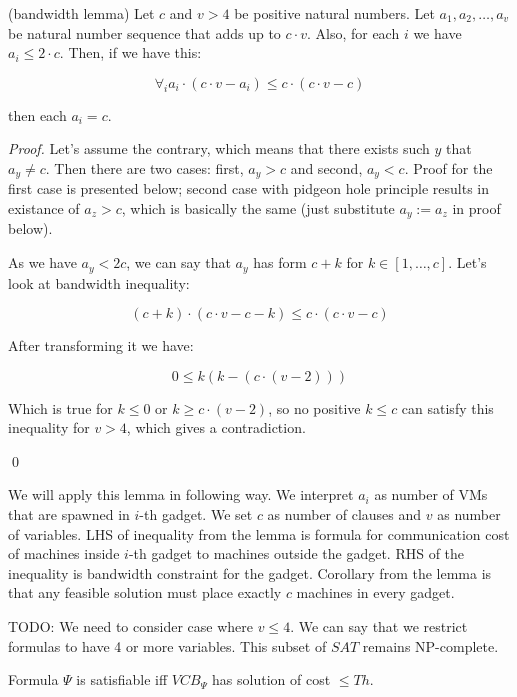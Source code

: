 \begin{lemma} (bandwidth lemma)
  Let $c$ and $v > 4$ be positive natural numbers. Let $a_1, a_2, \ldots,
  a_v$ be natural number sequence that adds up to $c \cdot v$. Also, for
  each $i$ we have $a_i \leq 2 \cdot c$. Then, if we have this:

  $$ \forall_i a_i \cdot (c \cdot v - a_i) \leq c \cdot (c \cdot v -
  c) $$

  then each $a_i = c$.
\end{lemma}
\begin{proof}

Let's assume the contrary, which means that there exists such $y$ that
$a_y \neq c$. Then there are two cases: first, $a_y>c$ and second,
$a_y<c$. Proof for the first case is presented below; second case
with pidgeon hole principle results in existance of $a_z > c$, which
is basically the same (just substitute $a_y := a_z$ in proof below).

As we have $a_y < 2c$, we can say that $a_y$ has form $c +
k$ for $k \in [1, \ldots, c]$. Let's look at bandwidth inequality:

$$ (c + k) \cdot (c \cdot v - c - k) \leq c \cdot (c \cdot v - c) $$

After transforming it we have:

$$ 0 \leq k(k - (c \cdot (v - 2))) $$

Which is true for $k \leq 0$ or $k \geq c \cdot (v - 2)$, so no
positive $k \leq c$ can satisfy this inequality for $v > 4$, which gives a contradiction. 

\qed

\end{proof}

We will apply this lemma in following way. We interpret $a_i$ as
number of VMs that are spawned in $i$-th gadget. We set $c$ as number
of clauses and $v$ as number of variables. LHS of inequality from the
lemma is formula for communication cost of machines inside $i$-th
gadget to machines outside the gadget. RHS of the inequality is
bandwidth constraint for the gadget. Corollary from the lemma is that
any feasible solution must place exactly $c$ machines in every gadget.

TODO: We need to consider case where $v \leq 4$. We can say that we
restrict formulas to have 4 or more variables. This subset of $SAT$ remains NP-complete.

\begin{theorem}Formula $\Psi$ is satisfiable iff $VCB_{\Psi}$ has
solution of cost $\leq Th$.
\end{theorem}


